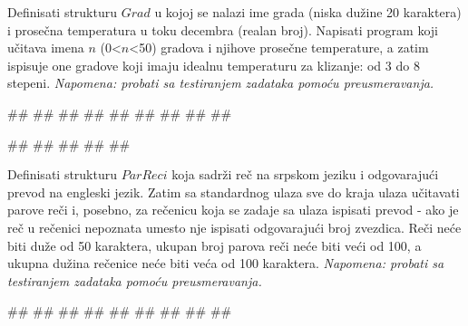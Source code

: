 \begin{Exercise}[label=p2.5_05] 
  Definisati strukturu $Grad$ u kojoj se nalazi ime grada (niska dužine 20 karaktera) i prosečna temperatura u toku decembra (realan broj). Napisati program koji učitava imena $n$ (0<$n$<50) gradova i njihove prosečne temperature, a zatim ispisuje one gradove koji imaju idealnu temperaturu za klizanje: od 3 do 8 stepeni. \textit{Napomena: probati sa testiranjem zadataka pomoću preusmeravanja.}\\
\begin{maxitest}
\begin{upotreba}{1}
#\naslovInt#
##
##
##
##
##
##
##
##
\end{upotreba}
\end{maxitest}

\begin{maxitest}
\begin{upotreba}{2}
#\naslovInt#
##
##
##
##
\end{upotreba}
\end{maxitest}
 

\end{Exercise}
\begin{Answer}[ref=p2.5_05]
\end{Answer}

\begin{Exercise}[label=p2.5_06] 
 Definisati strukturu $ParReci$ koja sadrži reč na srpskom jeziku i odgovarajući prevod na engleski jezik. Zatim sa standardnog ulaza sve do kraja ulaza učitavati parove reči i, posebno, za rečenicu koja se zadaje sa ulaza ispisati prevod - ako je reč u rečenici nepoznata umesto nje ispisati odgovarajući broj zvezdica. Reči neće biti duže od 50 karaktera, ukupan broj parova reči neće biti veći od 100, a ukupna dužina rečenice neće biti veća od 100 karaktera. \textit{Napomena: probati sa testiranjem zadataka pomoću preusmeravanja.}\\
\begin{miditest}
\begin{upotreba}{1}
#\naslovInt#
##
##
##
##
##
##
##
##
\end{upotreba}
\end{miditest}
\end{Exercise}
\begin{Answer}[ref=p2.5_06]
\end{Answer}

